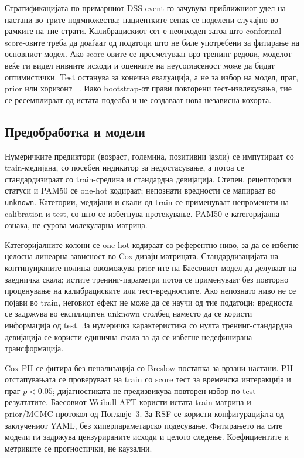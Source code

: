\documentclass[12pt]{article}
\begin{document}
Стратификацијата по примарниот DSS-event го зачувува приближниот удел на настани
во трите подмножества; пациентките сепак се поделени случајно во рамките на тие
страти. Калибрацискиот сет е неопходен затоа што conformal score-овите треба да
доаѓаат од податоци што не биле употребени за фитирање на основниот модел. Ако
score-овите се пресметуваат врз тренинг-редови, моделот веќе ги видел нивните
исходи и оценките на неусогласеност може да бидат оптимистички. Test останува за
конечна евалуација, а не за избор на модел, праг, prior или хоризонт
~\cite{angelopoulos2023}. Иако bootstrap-от прави повторени тест-извлекувања,
тие се ресемплираат од истата поделба и не создаваат нова независна кохорта.

\subsection{Предобработка и модели}

Нумеричките предиктори (возраст, големина, позитивни јазли) се импутираат со
train-медијана, со посебен индикатор за недостасување, а потоа се стандардизираат
со train-средина и стандардна девијација. Степен, рецепторски статуси и PAM50 се
one-hot кодираат; непознати вредности се мапираат во \texttt{unknown}. Категории,
медијани и скали од train се применуваат непроменети на calibration и test, со што
се избегнува протекување. PAM50 е категоријална ознака, не сурова молекуларна
матрица.

Категоријалните колони се one-hot кодираат со референтно ниво, за да се избегне
целосна линеарна зависност во Cox дизајн-матрицата. Стандардизацијата на
континуираните полиња овозможува prior-ите на Баесовиот модел да делуваат на
заедничка скала; истите тренинг-параметри потоа се применуваат без повторно
проценување на калибрациските или тест-вредностите. Ако непознато ниво не се
појави во train, неговиот ефект не може да се научи од тие податоци; вредноста
се задржува во експлицитен unknown столбец наместо да се користи информација од
test. За нумеричка карактеристика со нулта тренинг-стандардна девијација се
користи единична скала за да се избегне недефинирана трансформација.

Cox PH се фитира без пенализација со Breslow постапка за врзани настани.
PH отстапувањата се проверуваат на train со score тест за временска интеракција
и праг $p<0.05$; дијагностиката не предизвикува повторен избор по test
резултатите. Баесовиот Weibull AFT користи истата train матрица и prior/MCMC
протокол од Поглавје~3. За RSF се користи конфигурацијата од заклучениот YAML,
без хиперпараметарско подесување. Фитирањето на сите модели ги задржува
цензурираните исходи и целото следење. Коефициентите и метриките се прогностички,
не каузални.
\end{document}
